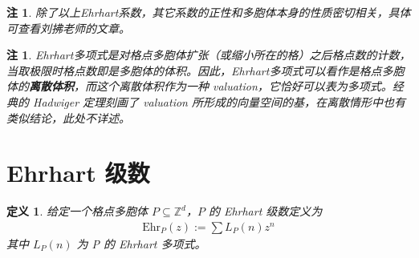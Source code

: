 \documentclass[12pt,a4paper]{ctexbook} %
\newcounter{theorem}[section]
\newtheorem{definition}[theorem]{定义}
\newtheorem{remark}[theorem]{注}
\numberwithin{figure}{section}
\theoremstyle{problemstyle}
\numberwithin{equation}{section} %
\begin{document}
\begin{remark}
    除了以上Ehrhart系数，其它系数的正性和多胞体本身的性质密切相关，具体可查看刘拂老师的文章\cite{FL19}。
\end{remark}
\begin{remark}
    Ehrhart多项式是对格点多胞体扩张（或缩小所在的格）之后格点数的计数，当取极限时格点数即是多胞体的体积。因此，Ehrhart多项式可以看作是格点多胞体的\textbf{离散体积}，而这个离散体积作为一种 valuation，它恰好可以表为多项式。经典的 Hadwiger 定理刻画了 valuation 所形成的向量空间的基，在离散情形中也有类似结论，此处不详述。
\end{remark}




\section{Ehrhart 级数}

\begin{definition}
    给定一个格点多胞体 $ P \subseteq \mathbb{Z}^d $，$ P $ 的 Ehrhart 级数定义为
\begin{align*}
 \text{Ehr}_P(z) := \sum L_P(n) z^n
\end{align*}
其中 $ L_P(n) $ 为 P 的 Ehrhart 多项式。
\end{definition}\label{Ehrhart1}
\end{document}
